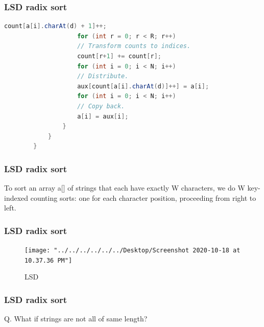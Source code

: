 \documentclass[11pt]{beamer}
\begin{document}
\begin{frame}[fragile]
	\frametitle{LSD radix sort}
	
	\begin{lstlisting}[language=Java]		
			    	count[a[i].charAt(d) + 1]++;
					for (int r = 0; r < R; r++)    
					// Transform counts to indices.
					count[r+1] += count[r];
					for (int i = 0; i < N; i++)    
					// Distribute.
					aux[count[a[i].charAt(d)]++] = a[i];
					for (int i = 0; i < N; i++)     
					// Copy back.
					a[i] = aux[i];
				} 
			}
		}
	\end{lstlisting}
\end{frame}
\begin{frame}[fragile]
	\frametitle{ LSD radix sort}
	\begin{flushleft}
		To sort an array a[] of strings that each have exactly W characters, we do W key-indexed counting sorts: one for each character position, proceeding from right to left.
	\end{flushleft}   
\end{frame}

\begin{frame}[fragile]
	\frametitle{LSD radix sort }
	\begin{figure}
		\centering
		\texttt{[image: "../../../../../../Desktop/Screenshot 2020-10-18 at 10.37.36 PM"]}
		\caption{LSD}
		\label{fig:screenshot-2020-10-18-at-10}
	\end{figure}	
\end{frame}

\begin{frame}
	\frametitle{LSD radix sort}
	\pause
	Q. What if strings are not all of same length?
\end{frame}
\end{document}
